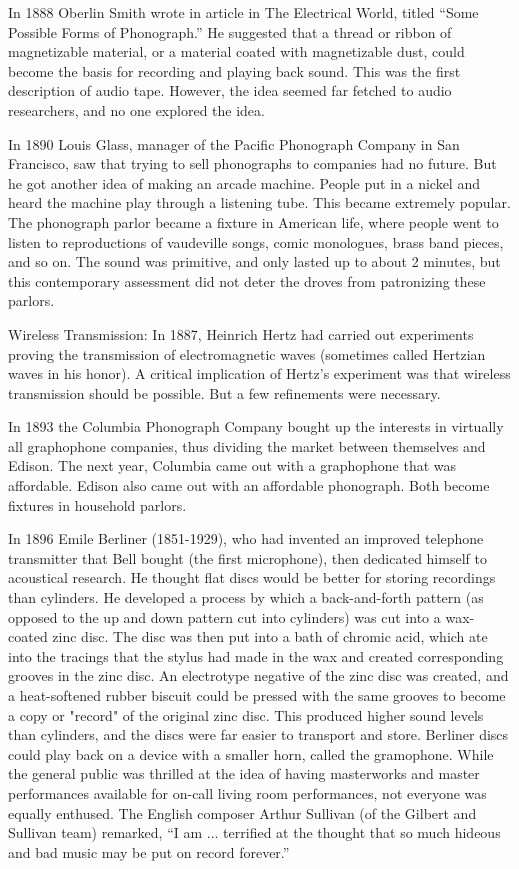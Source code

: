 In 1888 Oberlin Smith wrote in article in The Electrical World, titled ``Some Possible Forms of Phonograph.'' He suggested that a thread or ribbon of magnetizable material, or a material coated with magnetizable dust, could become the basis for recording and playing back sound. This was the first description of audio tape. However, the idea seemed far fetched to audio researchers, and no one explored the idea.

In 1890 Louis Glass, manager of the Pacific Phonograph Company in San Francisco, saw that trying to sell phonographs to companies had no future. But he got another idea of making an arcade machine. People put in a nickel and heard the machine play through a listening tube. This became extremely popular. The phonograph parlor became a fixture in American life, where people went to listen to reproductions of vaudeville songs, comic monologues, brass band pieces, and so on. The sound was primitive, and only lasted up to about 2 minutes, but this contemporary assessment did not deter the droves from patronizing these parlors.

Wireless Transmission: In 1887, Heinrich Hertz had carried out experiments proving the transmission of electromagnetic waves (sometimes called Hertzian waves in his honor). A critical implication of Hertz's experiment was that wireless transmission should be possible. But a few refinements were necessary.

In 1893 the Columbia Phonograph Company bought up the interests in virtually all graphophone companies, thus dividing the market between themselves and Edison. The next year, Columbia came out with a graphophone that was affordable. Edison also came out with an affordable phonograph. Both become fixtures in household parlors.

In 1896 Emile Berliner (1851-1929), who had invented an improved telephone transmitter that Bell bought (the first microphone), then dedicated himself to acoustical research. He thought flat discs would be better for storing recordings than cylinders.  He developed a process by which a back-and-forth pattern (as opposed to the up and down pattern cut into cylinders) was cut into a wax-coated zinc disc. The disc was then put into a bath of chromic acid, which ate into the tracings that the stylus had made in the wax and created corresponding grooves in the zinc disc. An electrotype negative of the zinc disc was created, and a heat-softened rubber biscuit could be pressed with the same grooves to become a copy or "record" of the original zinc disc. This produced higher sound levels than cylinders, and the discs were far easier to transport and store. Berliner discs could play back on a device with a smaller horn, called the gramophone. While the general public was thrilled at the idea of having masterworks and master performances available for on-call living room performances, not everyone was equally enthused. The English composer Arthur Sullivan (of the Gilbert and Sullivan team) remarked, ``I am ... terrified at the thought that so much hideous and bad music may be put on record forever.''

